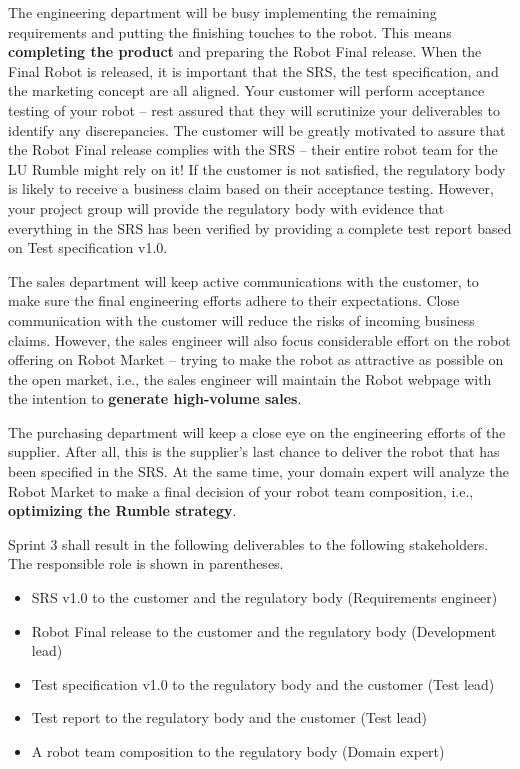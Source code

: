 \documentclass{scrreprt}
\begin{document}
The engineering department will be busy implementing the remaining requirements and putting the finishing touches to the robot. This means \textbf{completing the product} and preparing the Robot Final release. When the Final Robot is released, it is important that the SRS, the test specification, and the marketing concept are all aligned. Your customer will perform acceptance testing of your robot -- rest assured that they will scrutinize your deliverables to identify any discrepancies. The customer will be greatly motivated to assure that the Robot Final release complies with the SRS -- their entire robot team for the LU Rumble might rely on it! If the customer is not satisfied, the regulatory body is likely to receive a business claim based on their acceptance testing. However, your project group will provide the regulatory body with evidence that everything in the SRS has been verified by providing a complete test report based on Test specification v1.0.
 
The sales department will keep active communications with the customer, to make sure the final engineering efforts adhere to their expectations. Close communication with the customer will reduce the risks of incoming business claims. However, the sales engineer will also focus considerable effort on the robot offering on Robot Market -- trying to make the robot as attractive as possible on the open market, i.e., the sales engineer will maintain the Robot webpage with the intention to \textbf{generate high-volume sales}.

The purchasing department will keep a close eye on the engineering efforts of the supplier. After all, this is the supplier's last chance to deliver the robot that has been specified in the SRS. At the same time, your domain expert will analyze the Robot Market to make a final decision of your robot team composition, i.e., \textbf{optimizing the Rumble strategy}. 

Sprint 3 shall result in the following deliverables to the following stakeholders. The responsible role is shown in parentheses.
\begin{itemize}
\item SRS v1.0 to the customer and the regulatory body (Requirements engineer)
\item Robot Final release to the customer and the regulatory body (Development lead)
\item Test specification v1.0 to the regulatory body and the customer (Test lead)
\item Test report to the regulatory body and the customer (Test lead)
\item A robot team composition to the regulatory body (Domain expert)
\end{itemize}
\end{document}
